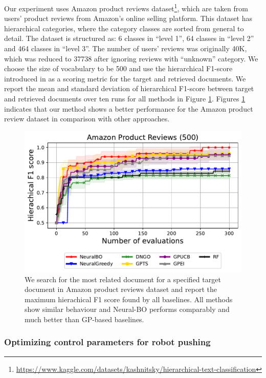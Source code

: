 Our experiment uses Amazon product reviews 
dataset\footnote{\url{https://www.kaggle.com/datasets/kashnitsky/hierarchical-text-classification}}, which are taken from users' product reviews from Amazon's online selling platform. This dataset has hierarchical categories, where the category classes are sorted from general to detail. The dataset is structured as: 6 classes in ``level 1'', 64 classes in ``level 2'' and 464 classes in ``level 3''. The number of users' reviews was originally 40K, which was reduced to 37738 after ignoring reviews with ``unknown'' category. We choose the size of vocabulary to be 500 and use the hierarchical F1-score introduced in  \citet{kiritchenko2005functional} as a scoring metric for the target and retrieved documents. We report the mean and standard deviation of hierarchical F1-score between target and retrieved documents over ten runs for all methods in Figure \ref{fig:text}. Figures \ref{fig:text} indicates that our method shows a better performance for the Amazon product review dataset in comparison with other approaches. 

\begin{figure}[ht!]
    \centering
    \includegraphics[width=\textwidth]{Figures/Neural-BO/Neural-BO_AmazonReview_dim_500_round_300.pdf}
    \caption{We search for the most related document for a specified target document in Amazon product reviews dataset and report the maximum hierachical F1 score found by all baselines. All methods show similar behaviour and Neural-BO performs comparably and much better than GP-based baselines.}
    \label{fig:text}
\end{figure}
\subsubsection{Optimizing control parameters for robot pushing} 


